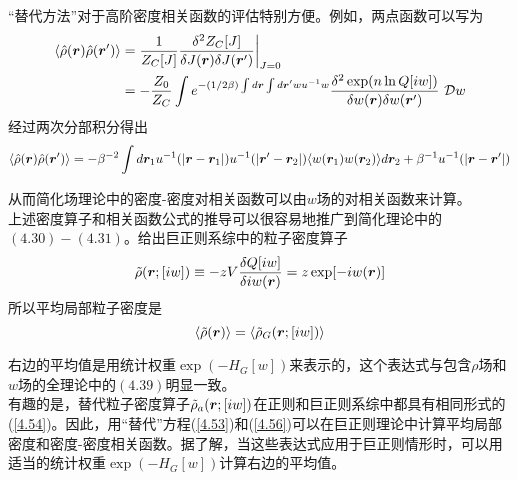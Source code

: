 “替代方法”对于高阶密度相关函数的评估特别方便。例如，两点函数可以写为\\
\begin{equation}
\begin{aligned}
\langle  \hat{ \rho } (\bm{r}) \hat{ \rho } (\bm{r}') \rangle &= \frac{1}{Z_{C}[J]} \frac{\delta ^{2}Z_{C}[J]}{\delta J(\bm{r}) \delta J(\bm{r}')} \bigg|_{J=0} \\&= -\frac{Z_0}{Z_{C}} \int  e^{-(1/2 \beta ) \int d\bm{r} \int d\bm{r}' w u^{-1} w } \frac{ \delta ^{2} \exp (n \ln Q[i w ])}{\delta w (\bm{r}) \delta w (\bm{r}')} ~\mathcal{D} w
\end{aligned}
\label{4.55}
\end{equation}
经过两次分部积分得出\\
\begin{equation}
\langle  \hat{ \rho } (\bm{r}) \hat{ \rho } (\bm{r}') \rangle = - \beta ^{-2} \int d\bm{r}_{1}  u^{-1}(|\bm{r}-\bm{r}_{1}|) u^{-1}(|\bm{r}'-\bm{r}_{2}|) \langle w(\bm{r}_1) w(\bm{r}_2)\rangle d\bm{r}_{2} + \beta ^{-1} u^{-1} (|\bm{r}-\bm{r}'|)
\label{4.56}
\end{equation}

从而简化场理论中的密度-密度对相关函数可以由$w$场的对相关函数来计算。\\

上述密度算子和相关函数公式的推导可以很容易地推广到简化理论中的$(4.30)-(4.31)$。给出巨正则系综中的粒子密度算子\\
\begin{equation}
\tilde{ \rho }(\bm{r};[i w ]) \equiv -z V \frac{ \delta Q[i w]}{\delta i w (\bm{r})} = z \exp [-i w (\bm{r})]
\end{equation}
所以平均局部粒子密度是\\
\begin{equation}
\langle \tilde{ \rho } (\bm{r}) \rangle = \langle \tilde{ \rho }_{G}(\bm{r};[i w ]) \rangle
\end{equation}

右边的平均值是用统计权重$\exp ( -H_{G}[ w])$来表示的，这个表达式与包含$ \rho $场和$ w $场的全理论中的$(4.39)$明显一致。\\

有趣的是，替代粒子密度算子$ \tilde{ \rho }_{a}(\bm{r};[i w])$在正则和巨正则系综中都具有相同形式的(\ref{4.54})。因此，用“替代”方程(\ref{4.53})和(\ref{4.56})可以在巨正则理论中计算平均局部密度和密度-密度相关函数。据了解，当这些表达式应用于巨正则情形时，可以用适当的统计权重$\exp (-H_{G}[ w ])$计算右边的平均值。\\

